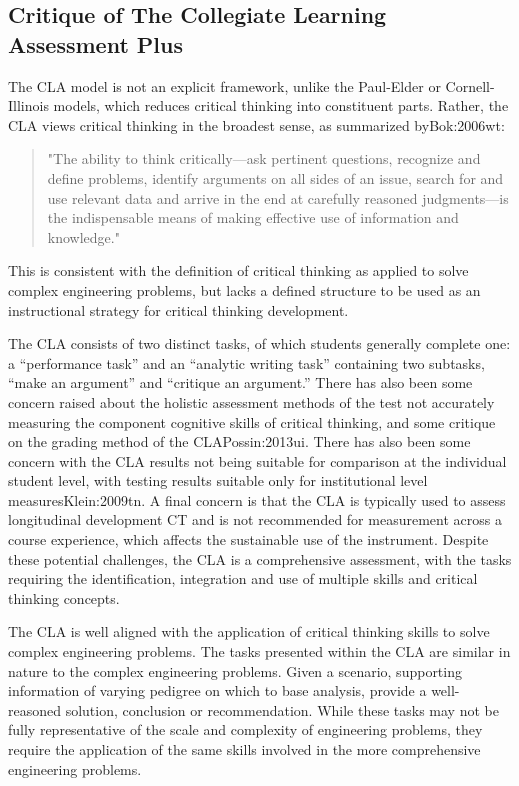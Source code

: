 \subsection{Critique of The Collegiate Learning Assessment Plus}


The CLA model is not an explicit framework, unlike the Paul-Elder or Cornell-Illinois models, which reduces critical thinking into constituent parts. Rather, the CLA views critical thinking in the broadest sense, as summarized by{Bok:2006wt}:

\begin{quote}
"The ability to think critically—ask pertinent questions, recognize and define problems, identify arguments on all sides of an issue, search for and use relevant data and arrive in the end at carefully reasoned judgments—is the indispensable means of making effective use of information and knowledge."
\end{quote}

This is consistent with the definition of critical thinking as applied to solve complex engineering problems, but lacks a defined structure to be used as an instructional strategy for critical thinking development. 

The CLA consists of two distinct tasks, of which students generally complete one: a “performance task” and an “analytic writing task” containing two subtasks, “make an argument” and “critique an argument.” There has also been some concern raised about the holistic assessment methods of the test not accurately measuring the component cognitive skills of critical thinking, and some critique on the grading method of the CLA{Possin:2013ui}. There has also been some concern with the CLA results not being suitable for comparison at the individual student level, with testing results suitable only for institutional level measures{Klein:2009tn}.  A final concern is that the CLA is typically used to assess longitudinal development CT and is not recommended for measurement across a course experience, which affects the sustainable use of the instrument.  Despite these potential challenges, the CLA is a comprehensive assessment, with the tasks requiring the identification, integration and use of multiple skills and critical thinking concepts.  

The CLA is well aligned with the application of critical thinking skills to solve complex engineering problems.  The tasks presented within the CLA are similar in nature to the complex engineering problems.  Given a scenario, supporting information of varying pedigree on which to base analysis, provide a well-reasoned solution, conclusion or recommendation.   While these tasks may not be fully representative of the scale and complexity of engineering problems, they require the application of the same skills involved in the more comprehensive engineering problems.
